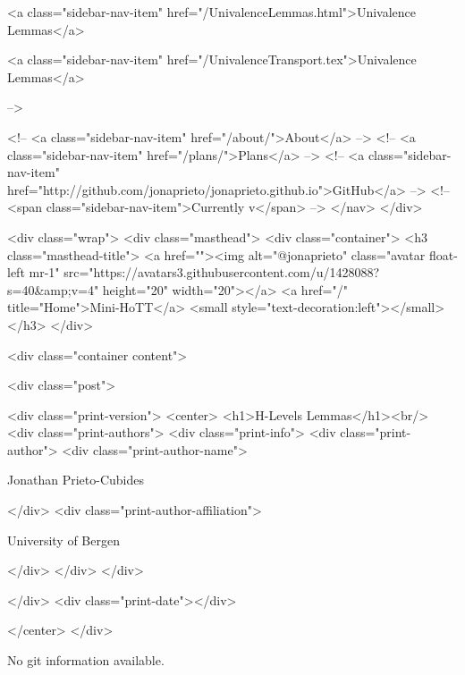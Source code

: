      
    
      
        
          <a class="sidebar-nav-item" href="/UnivalenceLemmas.html">Univalence Lemmas</a>
        
      
    
      
        
          <a class="sidebar-nav-item" href="/UnivalenceTransport.tex">Univalence Lemmas</a>
        
      
     -->

    <!-- <a class="sidebar-nav-item" href="/about/">About</a> -->
    <!-- <a class="sidebar-nav-item" href="/plans/">Plans</a> -->
    <!-- <a class="sidebar-nav-item" href="http://github.com/jonaprieto/jonaprieto.github.io">GitHub</a> -->
    <!-- <span class="sidebar-nav-item">Currently v</span> -->
  </nav>
</div>

    <div class="wrap">
      <div class="masthead">
        <div class="container">
          <h3 class="masthead-title">
            <a href=""><img alt="@jonaprieto" class="avatar float-left mr-1" src="https://avatars3.githubusercontent.com/u/1428088?s=40&amp;v=4" height="20" width="20"></a>
            <a href="/" title="Home">Mini-HoTT</a>
            <small style="text-decoration:left"></small>
          </h3>
        </div>
      
      <div class="container content">
        







<div class="post">

  <div class="print-version">
    <center>
      <h1>H-Levels Lemmas</h1><br/>
        <div class="print-authors">
          <div class="print-info">
            <div class="print-author">
              <div class="print-author-name">
                
                  Jonathan Prieto-Cubides
                
              </div>
              <div class="print-author-affiliation">
                
                  University of Bergen
                
                </div>
            </div>
          </div>
          
          
        </div>
        <div class="print-date"></div>
        
        
    </center>
  </div>

  
  No git information available.
  

